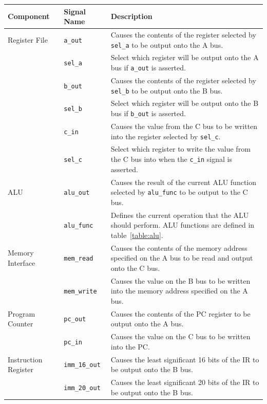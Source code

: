 \documentclass[a4paper,10pt]{article}
\begin{document}
\begin{table}[h]
\begin{center}
\begin{tabular}{|l|l|p{8cm}|}
\hline
\textbf{Component} & \textbf{Signal Name} & \textbf{Description} \\
\hline
Register File & \texttt{a\_out} & Causes the contents of the
register selected by \texttt{sel\_a} to be output onto the A bus. \\
\cline{2-3}
& \texttt{sel\_a} & Select which register will be output onto the A bus
if \texttt{a\_out} is asserted. \\
\cline{2-3}
& \texttt{b\_out} & Causes the contents of the
register selected by \texttt{sel\_b} to be output onto the B bus. \\
\cline{2-3}
& \texttt{sel\_b} & Select which register will be output onto the B bus
if \texttt{b\_out} is asserted. \\
\cline{2-3}
& \texttt{c\_in} & Causes the value from the C bus to be written
into the register selected by \texttt{sel\_c}.\\
\cline{2-3}
& \texttt{sel\_c} & Select which register to write the value from the C
bus into when the \texttt{c\_in} signal is asserted. \\
\hline
ALU & \texttt{alu\_out} & Causes the result of the current ALU function 
selected by \texttt{alu\_func} to be output to the C bus. \\
\cline{2-3}
& \texttt{alu\_func} & Defines the current operation that the ALU
should perform. ALU functions are defined in table~\ref{table:alu}. \\
\hline
Memory Interface & \texttt{mem\_read} & Causes the contents of the
memory address specified on the A bus to be read and output onto the C
bus. \\
\cline{2-3}
& \texttt{mem\_write} & Causes the value on the B bus to be written
into the memory address specified on the A bus. \\
\hline
Program Counter & \texttt{pc\_out} & Causes the contents of the PC
register to be output onto the A bus. \\
\cline{2-3}
& \texttt{pc\_in} & Causes the value on the C bus to be written into
the PC. \\
\hline
Instruction Register & \texttt{imm\_16\_out} & Causes the least
significant 16 bits of the IR to be output onto the B bus. \\
\cline{2-3}
& \texttt{imm\_20\_out} & Causes the least
significant 20 bits of the IR to be output onto the B bus. \\

\end{tabular}
\end{center}
\end{table}
\end{document}
